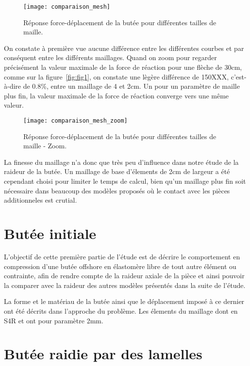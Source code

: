 ﻿ \documentclass{article}
\begin{document}
\begin{figure}[!h]
	\centering
	\texttt{[image: comparaison\_mesh]}
	\caption{Réponse force-déplacement de la butée pour différentes tailles de maille.}
	\label{fig1}
\end{figure}

On constate à première vue aucune différence entre les différentes courbes et par conséquent entre les différents maillages. Quand on zoom pour regarder précisément la valeur maximale de la force de réaction pour une flèche de 30cm, comme sur la figure~\ref{fig:fig1}, on constate une lègère différence de 150XXX, c'est-à-dire de 0.8\%, entre un maillage de 4 et 2cm. Un pour un paramètre de maille plus fin, la valeur maximale de la force de réaction converge vers une même valeur.

\begin{figure}[!h]
	\centering
	\texttt{[image: comparaison\_mesh\_zoom]}
	\caption{Réponse force-déplacement de la butée pour différentes tailles de maille - Zoom.}
	\label{fig1}
\end{figure}

La finesse du maillage n'a donc que très peu d'influence dans notre étude de la raideur de la butée. Un maillage de base d'élements de 2cm de largeur a été cependant choisi pour limiter le temps de calcul, bien qu'un maillage plus fin soit nécessaire dans beaucoup des modèles proposés où le contact avec les pièces additionneles est crutial.


\section{Butée initiale}

L'objectif de cette première partie de l'étude est de décrire le comportement en compression d'une butée offshore en élastomère libre de tout autre élément ou contrainte, afin de rendre compte de la raideur axiale de la pièce et ainsi pouvoir la comparer avec la raideur des autres modèles présentés dans la suite de l'étude.

La forme et le matériau de la butée ainsi que le déplacement imposé à ce dernier ont été décrits dans l'approche du problème. Les élements du maillage dont en S4R et ont pour paramètre 2mm. 



\section{Butée raidie par des lamelles}
\end{document}
